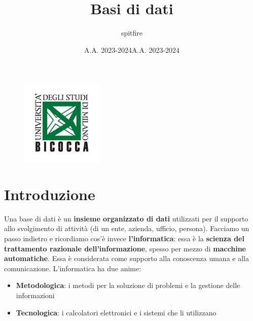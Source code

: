 \documentclass[12pt]{article}
\title{Basi di dati}
\author{spitfire}
\date{A.A. 2023-2024}
\begin{document}
\begin{figure}
    \centering
    \includegraphics[width=0.35\textwidth]{Images/Logo scienze bicocca.png}
\end{figure}

\vspace{10cm}
\date{A.A. 2023-2024}


\maketitle

\newpage

\tableofcontents
\newpage
\section{Introduzione}
Una base di dati è un \textbf{insieme organizzato di dati} utilizzati per il supporto allo svolgimento di attività (di un ente, azienda, ufficio, persona).
Facciamo un passo indietro e ricordiamo cos'è invece \textbf{l'informatica}:
essa è la \textbf{scienza del trattamento razionale dell'informazione}, spesso per mezzo di \textbf{macchine automatiche}.
Essa è considerata come supporto alla conoscenza umana e alla comunicazione.
L'informatica ha due anime:
\begin{itemize}
    \item \textbf{Metodologica}: i metodi per la soluzione di problemi e la gestione delle informazioni
    \item \textbf{Tecnologica}: i calcolatori elettronici e i sistemi che li utilizzano
\end{itemize}
\end{document}
